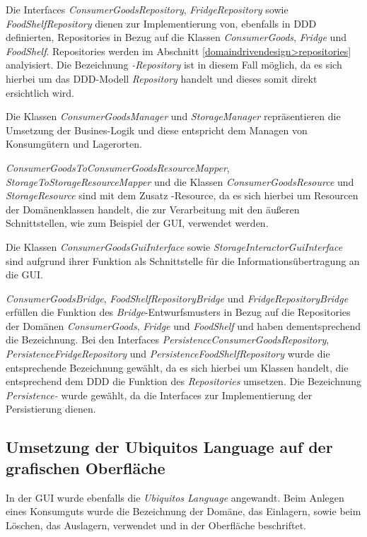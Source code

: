 Die Interfaces \textit{ConsumerGoodsRepository}, \textit{FridgeRepository} sowie \textit{FoodShelfRepository} dienen zur Implementierung von, ebenfalls in \ac{DDD} definierten, Repositories in Bezug auf die Klassen \textit{ConsumerGoods}, \textit{Fridge} und \textit{FoodShelf}.
Repositories werden im Abschnitt \ref{domaindrivendesign>repositories} analyisiert.
Die Bezeichnung \textit{-Repository} ist in diesem Fall möglich, da es sich hierbei um das \ac{DDD}-Modell \textit{Repository} handelt und dieses somit direkt ersichtlich wird.

Die Klassen \textit{ConsumerGoodsManager} und \textit{StorageManager} repräsentieren die Umsetzung der Busines-Logik und diese entspricht dem Managen von Konsumgütern und Lagerorten. 

\textit{ConsumerGoodsToConsumerGoodsResourceMapper}, \textit{StorageToStorageResourceMapper} und die Klassen \textit{ConsumerGoodsResource} und \textit{StorageResource} sind mit dem Zusatz -Resource, da es sich hierbei um Resourcen der Domänenklassen handelt, die zur Verarbeitung mit den äußeren Schnittstellen, wie zum Beispiel der \ac{GUI}, verwendet werden.

Die Klassen \textit{ConsumerGoodsGuiInterface} sowie \textit{StorageInteractorGuiInterface} sind aufgrund ihrer Funktion als Schnittstelle für die Informationsübertragung an die GUI.

\textit{ConsumerGoodsBridge}, \textit{FoodShelfRepositoryBridge} und \textit{FridgeRepositoryBridge} erfüllen die Funktion des \textit{Bridge}-Entwurfsmusters in Bezug auf die Repositories der Domänen \textit{ConsumerGoods}, \textit{Fridge} und \textit{FoodShelf} und haben dementsprechend die Bezeichnung.
Bei den Interfaces \textit{PersistenceConsumerGoodsRepository}, \textit{PersistenceFridgeRepository} und \textit{PersistenceFoodShelfRepository} wurde die entsprechende Bezeichnung gewählt, da es sich hierbei um Klassen handelt, die entsprechend dem \ac{DDD} die Funktion des \textit{Repositories} umsetzen.
Die Bezeichnung \textit{Persistence-} wurde gewählt, da die Interfaces zur Implementierung der Persistierung dienen.


\subsection*{Umsetzung der Ubiquitos Language auf der grafischen Oberfläche}
In der GUI wurde ebenfalls die \textit{Ubiquitos Language} angewandt.
Beim Anlegen eines Konsumguts wurde die Bezeichnung der Domäne, das Einlagern, sowie beim Löschen, das Auslagern, verwendet und in der Oberfläche beschriftet.

